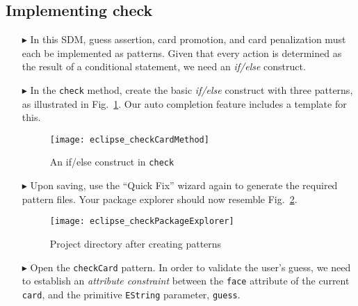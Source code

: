 \newpage
\hypertarget{checkCard tex}{}
\subsection{Implementing check}
\texHeader
 
\begin{itemize}
   
\item[$\blacktriangleright$] In this SDM, guess assertion, card promotion, and card penalization must each be implemented as patterns. Given that every
action is determined as the result of a conditional statement, we need an \emph{if/else} construct.

\item[$\blacktriangleright$] In the \texttt{check} method, create the basic \emph{if/else} construct with three patterns, as illustrated in
Fig.~\ref{eclipse:checkDec}. Our auto completion feature includes a template for this.

\vspace{0.5cm}

\begin{figure}[htbp]
\begin{center}
  \texttt{[image: eclipse\_checkCardMethod]}
  \caption{An if/else construct in \texttt{check}}
  \label{eclipse:checkDec}
\end{center}
\end{figure} 

\item[$\blacktriangleright$] Upon saving, use the ``Quick Fix'' wizard again to generate the required pattern files. Your package explorer should now resemble
Fig.~\ref{eclipse:checkPatternsExplorer}.

\begin{figure}[htbp]
\begin{center}
  \texttt{[image: eclipse\_checkPackageExplorer]}
  \caption{Project directory after creating patterns}
  \label{eclipse:checkPatternsExplorer}
\end{center}
\end{figure} 

\item[$\blacktriangleright$] Open the \texttt{checkCard} pattern. In order to validate the user's guess, we need to establish an \emph{attribute constraint}
between the \texttt{face} attribute of the current \texttt{card}, and the primitive \texttt{EString} parameter, \texttt{guess}. 


\end{itemize}

